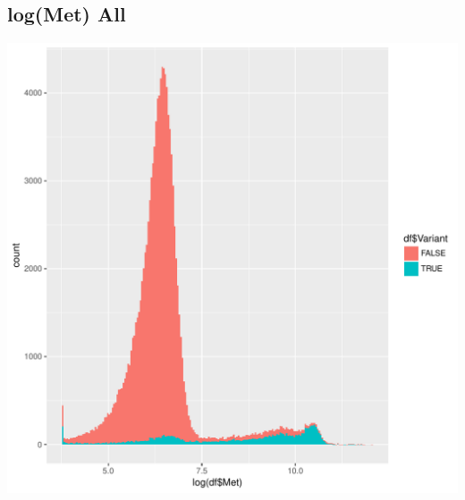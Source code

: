 \documentclass{article}\usepackage[]{graphicx}\usepackage[]{color}
\newenvironment{knitrout}{}{} %
\begin{document}
\subsection{log(Met) All}
\begin{knitrout}
\color{fgcolor}

{\centering \includegraphics[width=1\linewidth]{figure/minimal-dens_all_met-1} 

}



\end{knitrout}
\clearpage
\end{document}
